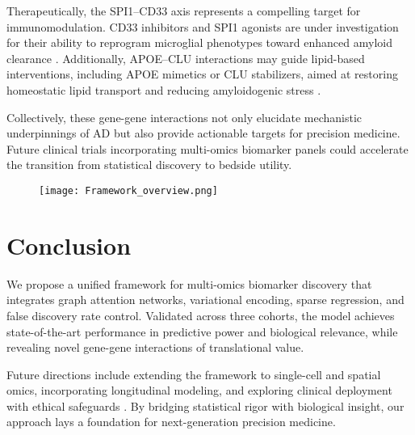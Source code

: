 \documentclass[12pt]{article}
\begin{document}
Therapeutically, the SPI1–CD33 axis represents a compelling target for immunomodulation. CD33 inhibitors and SPI1 agonists are under investigation for their ability to reprogram microglial phenotypes toward enhanced amyloid clearance \citep{booth2023cd33}. Additionally, APOE–CLU interactions may guide lipid-based interventions, including APOE mimetics or CLU stabilizers, aimed at restoring homeostatic lipid transport and reducing amyloidogenic stress \citep{zhou2022apoe}.

Collectively, these gene-gene interactions not only elucidate mechanistic underpinnings of AD but also provide actionable targets for precision medicine. Future clinical trials incorporating multi-omics biomarker panels could accelerate the transition from statistical discovery to bedside utility.

\begin{figure}[H]
\centering
\texttt{[image: Framework\_overview.png]}
\label{fig:framework_overview}
\end{figure}










\section{Conclusion}
We propose a unified framework for multi-omics biomarker discovery that integrates graph attention networks, variational encoding, sparse regression, and false discovery rate control. Validated across three cohorts, the model achieves state-of-the-art performance in predictive power and biological relevance, while revealing novel gene-gene interactions of translational value.

Future directions include extending the framework to single-cell and spatial omics, incorporating longitudinal modeling, and exploring clinical deployment with ethical safeguards \citep{winchester2023ai}. By bridging statistical rigor with biological insight, our approach lays a foundation for next-generation precision medicine.

\end{document}

